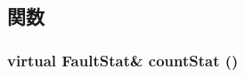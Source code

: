 \subsection{関数}
\hypertarget{classSparcISA_1_1SparcFaultBase_a5d92ccd11b5cd6b04f02bd0a088b776c}{
\subsubsection[{countStat}]{\setlength{\rightskip}{0pt plus 5cm}virtual {\bf FaultStat}\& countStat ()}}
\label{classSparcISA_1_1SparcFaultBase_a5d92ccd11b5cd6b04f02bd0a088b776c}


